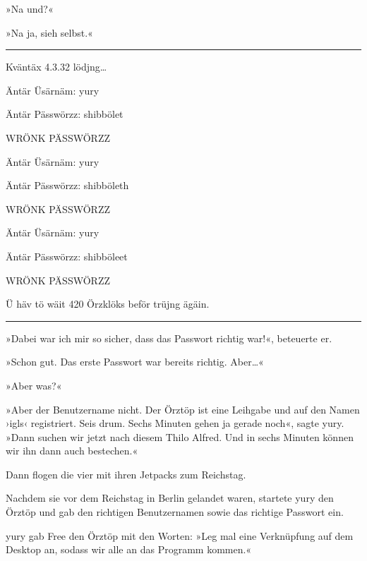 »Na und?«

»Na ja, sieh selbst.«

\noindent \parbox{\textwidth}{ \vspace{3ex} \hrule \vspace{3ex}

    \begin{footnotesize}
    \begin{ttfamily}

\noindent Kväntäx 4.3.32 lödjng…

\noindent Äntär Üsärnäm: yury

\noindent Äntär Pässwörzz: shibbölet

\noindent WRÖNK PÄSSWÖRZZ

\noindent Äntär Üsärnäm: yury

\noindent Äntär Pässwörzz: shibböleth

\noindent WRÖNK PÄSSWÖRZZ

\noindent Äntär Üsärnäm: yury

\noindent Äntär Pässwörzz: shibböleet

\noindent WRÖNK PÄSSWÖRZZ

\noindent Ü häv tö wäit 420 Örzklöks beför trüjng ägäin.

    \end{ttfamily}
    \end{footnotesize}

\vspace{3ex} \hrule \vspace{3ex} }

»Dabei war ich mir so sicher, dass das Passwort richtig war!«, beteuerte er.

»Schon gut. Das erste Passwort war bereits richtig. Aber…«

»Aber was?«

»Aber der Benutzername nicht. Der Örztöp ist eine Leihgabe und auf den Namen ›igls‹ registriert. Seis drum. Sechs Minuten gehen ja gerade noch«, sagte yury. »Dann suchen wir jetzt nach diesem Thilo Alfred. Und in sechs Minuten können wir ihn dann auch bestechen.«

Dann flogen die vier mit ihren Jetpacks zum Reichstag.

Nachdem sie vor dem Reichstag in Berlin gelandet waren, startete yury den Örztöp und gab den richtigen Benutzernamen sowie das richtige Passwort ein.

yury gab Free den Örztöp mit den Worten: »Leg mal eine Verknüpfung auf dem Desktop an, sodass wir alle an das Programm kommen.«

